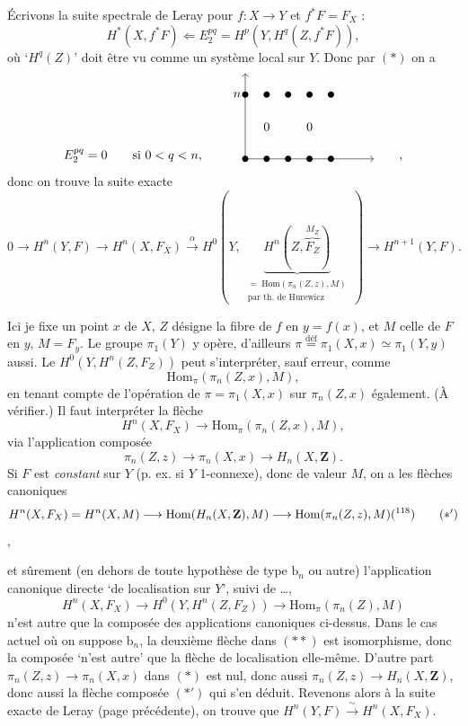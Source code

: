 \documentclass[11pt]{article}
\newcommand{\printedpage}[1]{{\reversemarginpar\marginnote{\raggedleft\scriptsize ed.~#1}}}
\newcommand{\msp}[1]{\marginpar{\raggedright\scriptsize ms.~#1}}
\begin{document}
\msp{page 181}
Écrivons la suite spectrale de Leray pour $f : X \longrightarrow Y$ et $f^*F = F_X$ :
\[
H^*(X,f^*F) \Longleftarrow E_2^{pq} = H^p(Y,H^q(Z,f^*F)),
\]
où ‘$H^q(Z)$’ doit être vu comme un système local sur $Y$. Donc par $(*)$ on a
\[
E_2^{pq}=0 \qquad \text{si } 0<q<n, \qquad
\begin{tikzpicture}[baseline=0pt, x=0.6cm, y=0.6cm]
\draw[->] (0,0) -- (0,4);
\draw[->] (0,0) -- (6,0);
\node[left] at (0,3) {$n$};
\foreach \i in {0,...,4} { \fill (\i,3) circle (2.5pt); \fill (\i,0) circle (2.5pt); }
\node at (1,1.5) {$0$};
\node at (3,1.5) {$0$};
\end{tikzpicture}
\qquad ,
\]
donc on trouve la suite exacte
\[
0 \longrightarrow H^n(Y,F) \longrightarrow H^n(X,F_X) \xrightarrow{\ \alpha\ } H^0(Y,\ \underbrace{H^n(Z,\overbrace{F_Z}^{M_Z})}_{\begin{array}{l}\scriptstyle = \ \mathrm{Hom}(\pi_n(Z,z),M)\\ \scriptstyle \text{par th. de Hurewicz}\end{array}}\ ) \longrightarrow H^{n+1}(Y,F).
\]

\printedpage{121}

Ici je fixe un point $x$ de $X$, $Z$ désigne la fibre de $f$ en $y=f(x)$, et $M$ celle de $F$ en $y$, $M=F_y$. Le groupe $\pi_1(Y)$ y opère, d’ailleurs $\pi \overset{\text{déf}}{=} \pi_1(X,x) \simeq \pi_1(Y,y)$ aussi. Le $H^0(Y,H^n(Z,F_Z))$ peut s’interpréter, sauf erreur, comme
\[
\mathrm{Hom}_\pi(\pi_n(Z,x),M),
\]
en tenant compte de l’opération de $\pi=\pi_1(X,x)$ sur $\pi_n(Z,x)$ également. (À vérifier.) Il faut interpréter la flèche
\[
H^n(X,F_X) \longrightarrow \mathrm{Hom}_\pi(\pi_n(Z,x),M),
\]
via l’application composée
\[
\pi_n(Z,z) \longrightarrow \pi_n(X,x) \longrightarrow H_n(X,\mathbf{Z}). \tag*{$(*)$}
\]
Si $F$ est \textit{constant} sur $Y$ (p. ex. si $Y$ 1-connexe), donc de valeur $M$, on a les flèches canoniques
\[
H^n(X,F_X) = H^n(X,M) \longrightarrow \mathrm{Hom}(H_n(X,\mathbf{Z}),M) \longrightarrow \mathrm{Hom}(\pi_n(Z,z),M)\text{(\footnotemark[118])} \tag*{$(*')$}
\]
,

\msp{page 182}
et sûrement (en dehors de toute hypothèse de type $\mathrm{b}_n$ ou autre) l’application canonique directe ‘de localisation sur $Y$’, suivi de \dots,
\[
H^n(X,F_X) \longrightarrow H^0(Y,H^n(Z,F_Z)) \longrightarrow \mathrm{Hom}_\pi(\pi_n(Z),M) \tag*{$(**)$}
\]
n’est autre que la composée des applications canoniques ci-dessus. Dans le cas actuel où on suppose $\mathrm{b}_n$, la deuxième flèche dans $(**)$ est isomorphisme, donc la composée ‘n’est autre’ que la flèche de localisation elle-même. D’autre part $\pi_n(Z,z) \longrightarrow \pi_n(X,x)$ dans $(*)$ est nul, donc aussi $\pi_n(Z,z) \longrightarrow H_n(X,\mathbf{Z})$, donc aussi la flèche composée $(*')$ qui s’en déduit. Revenons alors à la suite exacte de Leray (page précédente), on trouve que $H^n(Y,F) \xrightarrow{\ \sim\ } H^n(X,F_X)$.
\end{document}
